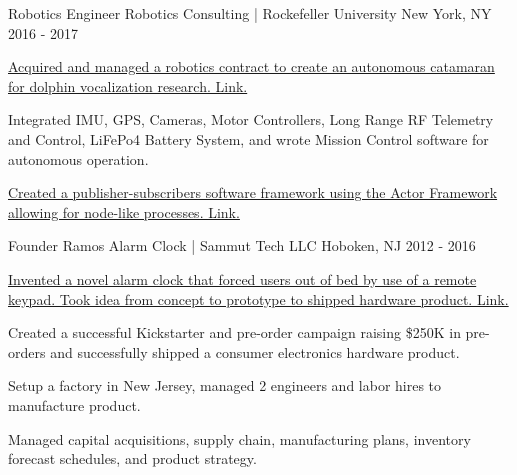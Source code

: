 \begin{cventries}
  \cventry
    {Robotics Engineer} %
    {Robotics Consulting | Rockefeller University} %
    {New York, NY} %
    {2016 - 2017} %
    {
      \begin{cvitems} %
          \item {\href{https://paulsammut.com/doku.php/robodolf}
            {Acquired and managed a robotics contract to create an autonomous catamaran for dolphin vocalization research. \color{darkblue}Link.}}
        \item {Integrated IMU, GPS, Cameras, Motor Controllers, Long Range RF Telemetry and Control, 
                    LiFePo4 Battery System, and wrote Mission Control software for autonomous operation.}
        \item {\href{http://bit.ly/2BSBD1c}{Created a publisher-subscribers
            software framework using the Actor Framework allowing for node-like processes. \color{darkblue}Link.}}
      \end{cvitems}
    }

  \cventry
    {Founder} %
    {Ramos Alarm Clock | Sammut Tech LLC} %
    {Hoboken, NJ} %
    {2012 - 2016} %
    {
      \begin{cvitems} %
        \item {\href{http://bit.ly/2NvLgHA}{Invented a novel alarm clock that forced users out of bed by use of a remote keypad. Took idea from concept to prototype to shipped hardware product. \color{darkblue}Link.}}
        \item {Created a successful Kickstarter and pre-order campaign raising \$250K in pre-orders and successfully shipped a consumer electronics hardware product.}
        \item {Setup a factory in New Jersey, managed 2 engineers and labor hires to manufacture product.}
        \item {Managed capital acquisitions, supply chain, manufacturing plans, inventory forecast schedules, and product strategy.}
      \end{cvitems}
    }


\end{cventries}
